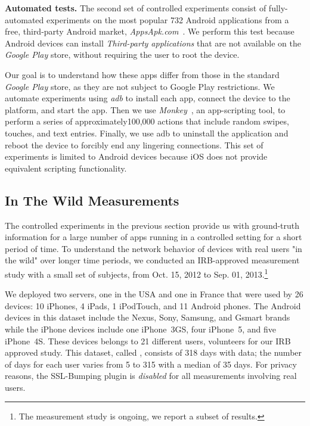 \noindent\textbf{Automated tests.} The second set of controlled experiments consist of fully-automated
experiments on the most popular 732 Android applications from a free,
third-party Android market, \emph{AppsApk.com}~\cite{appsapk}.
We perform this test because Android devices can install
\emph{Third-party applications} that are not available on the
\emph{Google Play} store, without requiring the user to root the device. 

Our goal is to understand how these apps differ from those in the standard \emph{Google Play} 
store, as they are not subject to Google Play restrictions.
We automate experiments using \emph{adb} to
install each app, connect the device to the \meddle platform, and
start the app. Then we use \emph{Monkey}~\cite{adbmonkey}, an app-scripting 
tool, to perform a series of  approximately100,000 actions that include
random swipes, touches, and text entries.  Finally, we use adb to
uninstall the application and reboot the device to forcibly end any
lingering connections. This set of experiments is limited to
Android devices because iOS does not provide equivalent 
scripting functionality. 

\subsection{In The Wild Measurements}
\label{sec:dataset-wild-measurements}

The controlled experiments in the previous section provide us with 
ground-truth information for a large number of apps running in a controlled 
setting for a short period of time. To understand the network behavior of 
devices with real users "in the wild" over longer time periods, we conducted 
an IRB-approved measurement study with a small set of subjects, from 
Oct. 15, 2012 to Sep. 01, 2013.\footnote{The measurement study is ongoing, we report a subset of results. }

We deployed two \platname servers, one in the USA and one in France
that were used by 26 devices: 10 iPhones, 4 iPads, 1 iPodTouch, and 11
Android phones.  The Android devices in this dataset include the
Nexus, Sony, Samsung, and Gsmart brands while the iPhone devices
include one iPhone~3GS, four iPhone~5, and five iPhone~4S.  These
devices belongs to 21 different users, volunteers for our IRB approved
study.  This dataset, called \mobWild, consists of 318 days with data; the number of 
days for each user varies from 5 to 315 with a median of 35 days.  For privacy reasons, the
SSL-Bumping plugin is \emph{disabled} for all measurements involving
real users.

